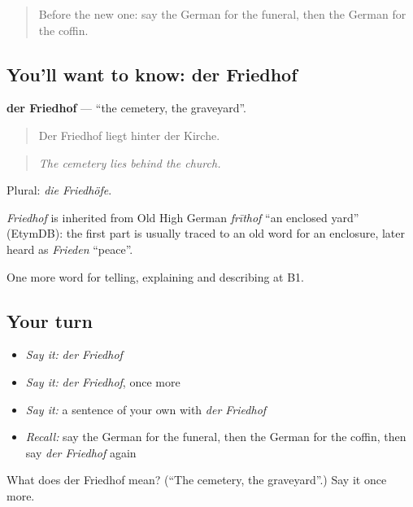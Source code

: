 \label{lesson:GE-C303-friedhof}



\begin{quote}
Before the new one: say the German for the funeral, then the German for the coffin.
\end{quote}

\subsection*{You'll want to know: der Friedhof}
\textbf{der Friedhof} — \textquotedblleft{}the cemetery, the graveyard\textquotedblright{}.

\begin{quote}
Der Friedhof liegt hinter der Kirche.
\end{quote}

\begin{quote}
\emph{The cemetery lies behind the church.}
\end{quote}

Plural: \emph{die Friedhöfe}.

\begin{cousinweb}
\emph{Friedhof} is inherited from Old High German \emph{frīthof} \textquotedblleft{}an enclosed yard\textquotedblright{} (EtymDB): the first part is usually traced to an old word for an enclosure, later heard as \emph{Frieden} \textquotedblleft{}peace\textquotedblright{}.
\end{cousinweb}

\begin{grammarlens}[title={What you've built}]
One more word for telling, explaining and describing at B1.
\end{grammarlens}

\subsection*{Your turn}
\begin{itemize}
\raggedright
  \item \emph{Say it:} \emph{der Friedhof}
  \item \emph{Say it:} \emph{der Friedhof}, once more
  \item \emph{Say it:} a sentence of your own with \emph{der Friedhof}
  \item \emph{Recall:} say the German for the funeral, then the German for the coffin, then say \emph{der Friedhof} again
\end{itemize}

\begin{tcolorbox}[breakable,colback=teal!4,colframe=teal!35!black,title={Before you move on}]
What does der Friedhof mean? (\textquotedblleft{}The cemetery, the graveyard\textquotedblright{}.) Say it once more.
\end{tcolorbox}
